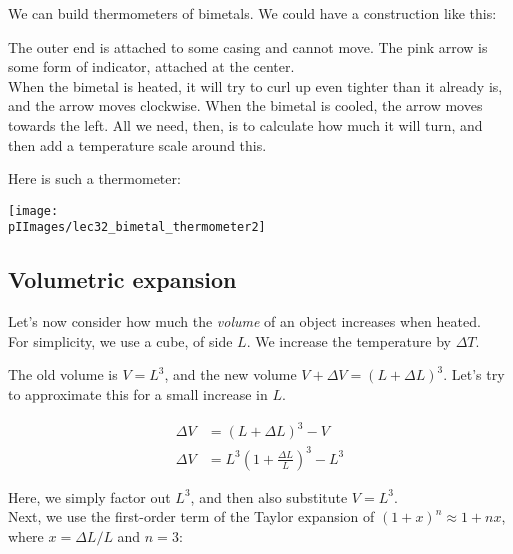 We can build thermometers of bimetals. We could have a construction like this:

\begin{figure}[H]
  \centering
{}
\end{figure}

The outer end is attached to some casing and cannot move. The pink arrow is some form of indicator, attached at the center.\\
When the bimetal is heated, it will try to curl up even tighter than it already is, and the arrow moves clockwise. When the bimetal is cooled, the arrow moves towards the left. All we need, then, is to calculate how much it will turn, and then add a temperature scale around this.

Here is such a thermometer:

\begin{center}
\texttt{[image: \\pIImages/lec32\_bimetal\_thermometer2]}
\end{center}

\subsection{Volumetric expansion}

Let's now consider how much the \emph{volume} of an object increases when heated.\\
For simplicity, we use a cube, of side $L$. We increase the temperature by $\Delta T$.

The old volume is $V = L^3$, and the new volume $V + \Delta V = \left(L + \Delta L\right)^3$. Let's try to approximate this for a small increase in $L$.

\begin{align}
\Delta V &= \left(L + \Delta L\right)^3 - V\\
\Delta V &= L^3 \left(1 +  \frac{\Delta L}{L}\right)^3 - L^3
\end{align}

Here, we simply factor out $L^3$, and then also substitute $V = L^3$.\\
Next, we use the first-order term of the Taylor expansion of $(1 + x)^n \approx 1 + n x$, where $x = \Delta L/L$ and $n = 3$:

